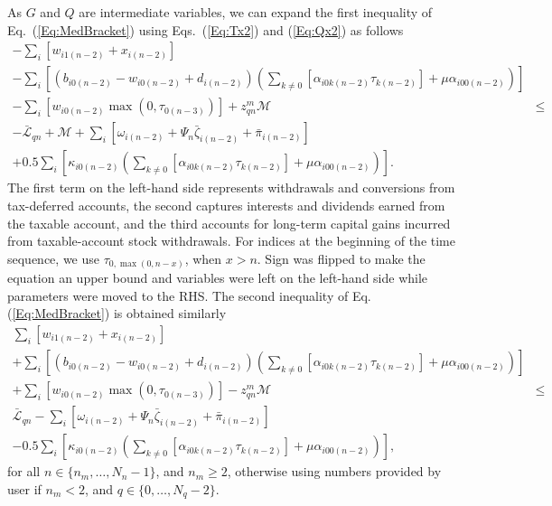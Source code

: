 \documentclass{report}[fleqn,12pt]
\begin{document}
	As $G$ and $Q$ are intermediate variables, we can expand the first inequality of Eq.~(\ref{Eq:MedBracket})
	using Eqs.~(\ref{Eq:Tx2}) and (\ref{Eq:Qx2}) as follows
	\begin{eqnarray}
		\label{Eq:Med1}
		- \sum_i [w_{i1(n-2)} + x_{i(n-2)}] && \nonumber \\
		- \sum_i \left[(b_{i0(n-2)} - w_{i0(n-2)} + d_{i(n-2)})
                \left(\sum_{k\neq 0}[\alpha_{i0k(n-2)}\tau_{k(n-2)}] + \mu\alpha_{i00(n-2)}\right)\right] &&
		\nonumber \\
		- \sum_i [w_{i0(n-2)}\max(0, \tau_{0(n-3)})] + z_{qn}^m \mathcal{M}
		& \leq& \nonumber \\
                - \bar{\mathcal{L}}_{qn} + \mathcal{M}
		+ \sum_i [\omega_{i(n-2)} + \Psi_n\bar\zeta_{i(n-2)} + \bar{\pi}_{i(n-2)}] && \nonumber\\
		+ 0.5\sum_{i} \left[\kappa_{i0(n-2)} \left(\sum_{k\neq 0}[\alpha_{i0k(n-2)}\tau_{k(n-2)}] + \mu\alpha_{i00(n-2)}\right)\right]. && 
	\end{eqnarray}
	The first term on the left-hand side represents withdrawals and conversions from tax-deferred accounts,
        the second captures interests and dividends earned from the taxable account,
        and the third accounts for long-term capital gains incurred from taxable-account stock withdrawals.
	For indices at the beginning of the time sequence, we use $\tau_{0, \max(0, n-x)}$, when $x>n$.
	Sign was flipped to make the equation an upper bound and variables were left on the left-hand side
        while parameters were moved to the RHS. The second inequality of Eq.(\ref{Eq:MedBracket})
        is obtained similarly
	\begin{eqnarray}
		\label{Eq:Med2}
		\sum_i [w_{i1(n-2)} + x_{i(n-2)}] && \nonumber \\
		+ \sum_i \left[(b_{i0(n-2)} - w_{i0(n-2)} + d_{i(n-2)})
                \left(\sum_{k\neq 0}[\alpha_{i0k(n-2)}\tau_{k(n-2)}] + \mu\alpha_{i00(n-2)}\right)\right] &&
		\nonumber \\
		+ \sum_i [w_{i0(n-2)}\max(0, \tau_{0(n-3)})] - z_{qn}^m \mathcal{M}
		& \leq& \nonumber \\
                 \bar{\mathcal{L}}_{qn}
		- \sum_i [\omega_{i(n-2)} + \Psi_n\bar\zeta_{i(n-2)} + \bar{\pi}_{i(n-2)}] && \nonumber\\
		- 0.5\sum_{i} \left[\kappa_{i0(n-2)} \left(\sum_{k\neq 0}[\alpha_{i0k(n-2)}\tau_{k(n-2)}] + \mu\alpha_{i00(n-2)}\right)\right], && 
	\end{eqnarray}
	for all $n \in \{n_m, \ldots, N_n-1\}$, and $n_m \ge 2$,
	otherwise using numbers provided by user if $n_m < 2$, and $q \in \{0,\ldots,N_q - 2\}$.
\end{document}
